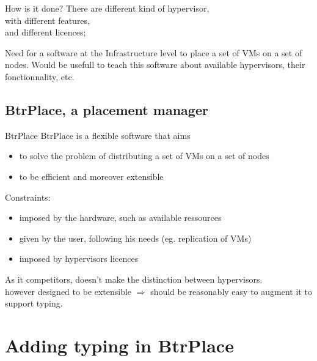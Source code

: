 \documentclass{beamer}
\begin{document}
\begin{frame}{How is it done?}
There are different kind  of hypervisor,\\
 with different features,\\ %
 and different licences; %

Need for a software at the Infrastructure level to place a set of VMs
on a set of nodes.
 Would be usefull to teach this software about available hypervisors,
their fonctionnality, etc.
\end{frame}

\subsection{BtrPlace, a placement manager}
\begin{frame}{BtrPlace}
BtrPlace is a flexible software that aims
\begin{itemize}
	\item to solve the problem of distributing a set of VMs on a set of
		nodes
	\item to be efficient and moreover extensible
\end{itemize}
Constraints:
\begin{itemize}
	\item imposed by the hardware, such as available ressources
	\item given by the user, following his needs (eg. replication
		of VMs)
	\item imposed by hypervisors licences
\end{itemize}
 As it competitors, doesn't make the distinction
between hypervisors.\\
however designed to be extensible $\Rightarrow$ should be reasonably
easy to augment it to support typing.
\end{frame}
\section{Adding typing in BtrPlace}
\end{document}
